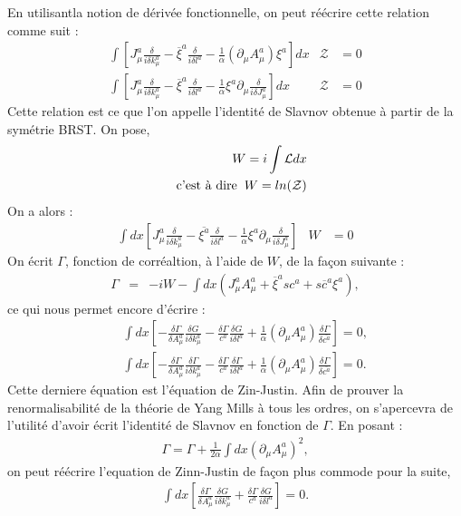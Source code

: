 \documentclass[a4paper,11pt]{article} %
\theoremstyle{plain}
\theoremstyle{definition}
\theoremstyle{remark}
\numberwithin{equation}{section}
\numberwithin{equation}{subsection}
\numberwithin{figure}{section}
\begin{document}
En utilisantla notion de dérivée fonctionnelle, on peut réécrire cette relation comme suit :
\begin{eqnarray*}
\int \left[ J_{\mu}^{a} \frac{\delta}{i \delta k^{a}_{\mu} } - \overline{\xi}^{a} \frac{\delta}{i \delta l^{a} }  
- \frac{1}{\alpha} \left( \partial_{\mu} A_{\mu}^{a} \right) \xi^{a} \right] dx  & \mathcal{Z}&  = 0 \\
\int \left[ J_{\mu}^{a} \frac{\delta}{i \delta k^{a}_{\mu} } - \overline{\xi}^{a} \frac{\delta}{i \delta l^{a} }  
- \frac{1}{\alpha} \xi^{a}  \partial_{\mu} \frac{\delta}{i \delta J_{\mu}^{a} }  \right] dx  & \mathcal{Z}&  = 0
\end{eqnarray*}
Cette relation est ce que l'on appelle l'identité de Slavnov obtenue à partir de la symétrie BRST. 
On pose,
\begin{eqnarray*}
 && W = i \int \mathcal{L} dx  \nonumber  \\
 && \text{c'est à dire} \hspace{2mm} W = ln ( \mathcal{Z} ) 
\end{eqnarray*}
On a alors :
\begin{eqnarray*}
 \int dx \left[ J^{a}_{\mu} \frac{\delta}{i \delta k^{a}_{\mu}} - \overline{\xi^{a}} \frac{\delta}{i \delta l^{a}} - \frac{1}{\alpha} 
\xi^{a} \partial_{\mu} \frac{\delta}{i \delta J^{a}_{\mu}}\right] &W& =0
\end{eqnarray*}
On écrit $\Gamma$, fonction de corréaltion, à l'aide de $W$, de la façon suivante :
\begin{eqnarray*}
 \Gamma &=& -iW - \int dx \left(J_{\mu}^{a}A_{\mu}^{a} + \overline{\xi}^{a}sc^{a} + s\overline{c}^{a}\xi^{a} \right) ,
\end{eqnarray*}
ce qui nous permet encore d'écrire :
\begin{eqnarray*}
 && \int dx \left[ -\frac{\delta \Gamma}{\delta A^{a}_{\mu}} \frac{\delta G }{i \delta k^{a}_{\mu}} 
- \frac{\delta \Gamma}{c^{a}}\frac{\delta G}{i \delta l^{a}} 
+ \frac{1}{\alpha} \left( \partial_{\mu} A^{a}_{\mu} \right) \frac{\delta \Gamma}{\delta \overline{c^{a}}}\right] = 0 ,  \\
 && \int dx \left[ -\frac{\delta \Gamma}{\delta A^{a}_{\mu}} \frac{\delta \Gamma }{i \delta k^{a}_{\mu}} 
- \frac{\delta \Gamma}{c^{a}}\frac{\delta \Gamma}{i \delta l^{a}} 
+ \frac{1}{\alpha} \left( \partial_{\mu} A^{a}_{\mu} \right) \frac{\delta \Gamma}{\delta \overline{c^{a}}}\right] = 0 .
\end{eqnarray*}
Cette derniere équation est l'équation de Zin-Justin. Afin de prouver la renormalisabilité de la théorie de Yang Mills à tous les ordres, 
on s'apercevra de l'utilité d'avoir écrit l'identité de Slavnov en fonction de $\Gamma$.
En posant :
\begin{eqnarray*}
 \Gamma = \Gamma + \frac{1}{2 \alpha} \int dx \left( \partial_{\mu} A^{a}_ {\mu} \right)^{2},
\end{eqnarray*}
on peut réécrire l'equation de Zinn-Justin de façon plus commode pour la suite,
\begin{eqnarray*}
 \int dx \left[ \frac{\delta \Gamma}{\delta A^{a}_{\mu}} \frac{\delta G }{i \delta k^{a}_{\mu}} 
+ \frac{\delta \Gamma}{c^{a}}\frac{\delta G}{i \delta l^{a}} \right] = 0.
\end{eqnarray*}
\end{document}
